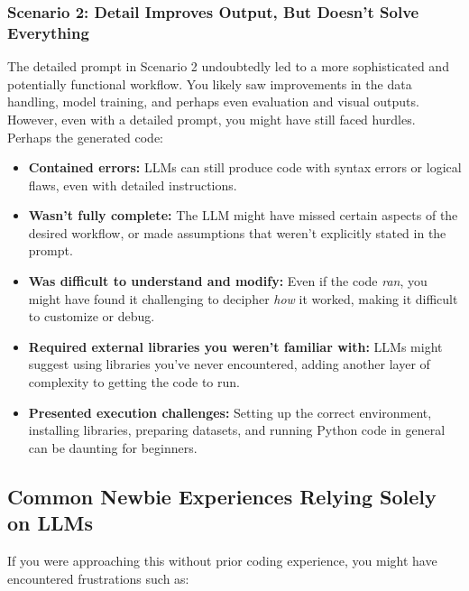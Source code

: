 \subsubsection{Scenario 2: Detail Improves Output, But Doesn't Solve Everything}
The detailed prompt in Scenario 2 undoubtedly led to a more sophisticated and potentially functional workflow.  You likely saw improvements in the data handling, model training, and perhaps even evaluation and visual outputs.  However, even with a detailed prompt, you might have still faced hurdles.  Perhaps the generated code:
\begin{itemize}
    \item \textbf{Contained errors:} LLMs can still produce code with syntax errors or logical flaws, even with detailed instructions.
    \item \textbf{Wasn't fully complete:}  The LLM might have missed certain aspects of the desired workflow, or made assumptions that weren't explicitly stated in the prompt.
    \item \textbf{Was difficult to understand and modify:} Even if the code \textit{ran}, you might have found it challenging to decipher \textit{how} it worked, making it difficult to customize or debug.
    \item \textbf{Required external libraries you weren't familiar with:}  LLMs might suggest using libraries you've never encountered, adding another layer of complexity to getting the code to run.
    \item \textbf{Presented execution challenges:} Setting up the correct environment, installing libraries, preparing datasets, and running Python code in general can be daunting for beginners.
\end{itemize}


\newpage
\subsection{Common Newbie Experiences Relying Solely on LLMs}

If you were approaching this without prior coding experience, you might have encountered frustrations such as:

